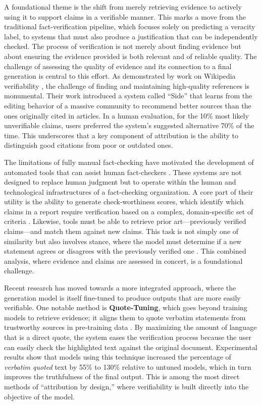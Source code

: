 \documentclass[11pt]{article}
\begin{document}
A foundational theme is the shift from merely retrieving evidence to actively using it to support claims in a verifiable manner. This marks a move from the traditional fact-verification pipeline, which focuses solely on predicting a veracity label, to systems that must also produce a justification that can be independently checked. The process of verification is not merely about finding evidence but about ensuring the evidence provided is both relevant and of reliable quality. The challenge of assessing the quality of evidence and its connection to a final generation is central to this effort. As demonstrated by work on Wikipedia verifiability \cite{ref427}, the challenge of finding and maintaining high-quality references is monumental. Their work introduced a system called ``Side'' that learns from the editing behavior of a massive community to recommend better sources than the ones originally cited in articles. In a human evaluation, for the 10\% most likely unverifiable claims, users preferred the system's suggested alternative 70\% of the time. This underscores that a key component of attribution is the ability to distinguish good citations from poor or outdated ones.

The limitations of fully manual fact-checking have motivated the development of automated tools that can assist human fact-checkers \cite{ref428,ref429}. These systems are not designed to replace human judgment but to operate within the human and technological infrastructures of a fact-checking organization. A core part of their utility is the ability to generate check-worthiness scores, which identify which claims in a report require verification based on a complex, domain-specific set of criteria \cite{ref430}. Likewise, tools must be able to retrieve prior art---previously verified claims---and match them against new claims. This task is not simply one of similarity but also involves stance, where the model must determine if a new statement agrees or disagrees with the previously verified one \cite{ref431}. This combined analysis, where evidence and claims are assessed in concert, is a foundational challenge.

Recent research has moved towards a more integrated approach, where the generation model is itself fine-tuned to produce outputs that are more easily verifiable. One notable method is \textbf{Quote-Tuning}, which goes beyond training models to retrieve evidence; it aligns them to quote verbatim statements from trustworthy sources in pre-training data \cite{ref432}. By maximizing the amount of language that is a direct quote, the system eases the verification process because the user can easily check the highlighted text against the original document. Experimental results show that models using this technique increased the percentage of \emph{verbatim quoted} text by 55\% to 130\% relative to untuned models, which in turn improves the truthfulness of the final output. This is among the most direct methods of ``attribution by design,'' where verifiability is built directly into the objective of the model.
\end{document}
